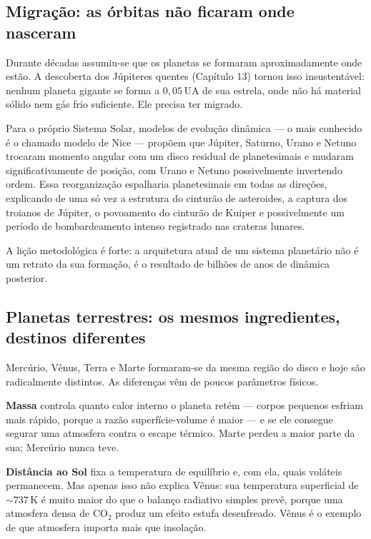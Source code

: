 \documentclass[11pt,a4paper]{article}
\begin{document}
\subsection*{Migração: as órbitas não ficaram onde nasceram}

Durante décadas assumiu-se que os planetas se formaram aproximadamente onde estão. A descoberta dos Júpiteres quentes (Capítulo 13) tornou isso insustentável: nenhum planeta gigante se forma a $0{,}05\,\mathrm{UA}$ de sua estrela, onde não há material sólido nem gás frio suficiente. Ele precisa ter migrado.

Para o próprio Sistema Solar, modelos de evolução dinâmica --- o mais conhecido é o chamado modelo de Nice --- propõem que Júpiter, Saturno, Urano e Netuno trocaram momento angular com um disco residual de planetesimais e mudaram significativamente de posição, com Urano e Netuno possivelmente invertendo ordem. Essa reorganização espalharia planetesimais em todas as direções, explicando de uma só vez a estrutura do cinturão de asteroides, a captura dos troianos de Júpiter, o povoamento do cinturão de Kuiper e possivelmente um período de bombardeamento intenso registrado nas crateras lunares.

A lição metodológica é forte: a arquitetura atual de um sistema planetário não é um retrato da sua formação, é o resultado de bilhões de anos de dinâmica posterior.

\subsection*{Planetas terrestres: os mesmos ingredientes, destinos diferentes}

Mercúrio, Vênus, Terra e Marte formaram-se da mesma região do disco e hoje são radicalmente distintos. As diferenças vêm de poucos parâmetros físicos.

\textbf{Massa} controla quanto calor interno o planeta retém --- corpos pequenos esfriam mais rápido, porque a razão superfície-volume é maior --- e se ele consegue segurar uma atmosfera contra o escape térmico. Marte perdeu a maior parte da sua; Mercúrio nunca teve.

\textbf{Distância ao Sol} fixa a temperatura de equilíbrio e, com ela, quais voláteis permanecem. Mas apenas isso não explica Vênus: sua temperatura superficial de $\sim737\,\mathrm{K}$ é muito maior do que o balanço radiativo simples prevê, porque uma atmosfera densa de CO$_2$ produz um efeito estufa desenfreado. Vênus é o exemplo de que atmosfera importa mais que insolação.
\end{document}
